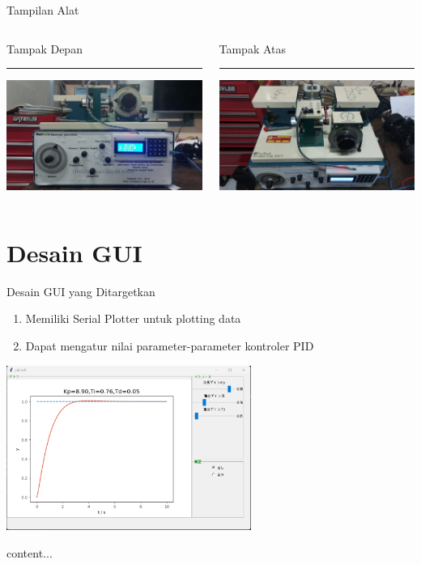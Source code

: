 \documentclass[10pt,xcolor={dvipsnames}]{beamer}
\begin{document}
\begin{frame}{Tampilan Alat}
	\begin{columns}[T] %
		\begin{column}{0.48\textwidth}
			Tampak Depan
			\color{black}\rule{\linewidth}{4pt}
			\includegraphics[width=7.5cm]{Gambar Lain/TampakDepan.jpeg}
		\end{column}%
		\hfill%
		\begin{column}{0.48\textwidth}
			Tampak Atas
			\color{blue}\rule{\linewidth}{4pt}
			\begin{center}
				\includegraphics[width=7.5cm]{Gambar Lain/TampakAtas.jpeg}
			\end{center}
		\end{column}
	\end{columns}
\end{frame}

\section{Desain GUI}
\begin{frame}{Desain GUI yang Ditargetkan}
	\begin{enumerate}
		\item Memiliki Serial Plotter untuk plotting data
		\item Dapat mengatur nilai parameter-parameter kontroler PID
	\end{enumerate}
	\begin{center}
		\includegraphics[width=8.0cm]{Tampilan GUI/WANNATHISGUI.png}
	\end{center}
\end{frame}
\begin{frame}
	\begin{center}
		content...
	\end{center}
\end{frame}
\end{document}
